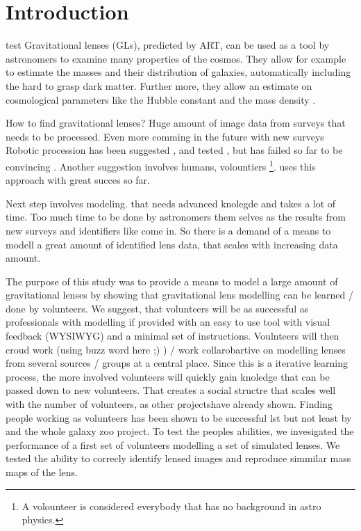 \section{Introduction}


test
Gravitational lenses (GLs), predicted by ART, can be used as a tool by astronomers to examine many properties of the cosmos.
They allow for example to estimate the masses and their distribution of galaxies, automatically including the hard to grasp dark matter.
Further more, they allow an estimate on cosmological parameters like the Hubble constant \citep{Saha2006} and the mass density \needcite.


How to find gravitational lenses? Huge amount of image data from surveys that needs to be processed.
Even more comming in the future with new surveys \needcite
Robotic procession has been suggested \needcite, and tested \needcite, but has failed so far to be convincing \needcite.
Another suggestion involves humans, volountiers \footnote{A volounteer is considered everybody that has no background in astro physics.}.
\sw uses this approach with great succes so far.\needcite


Next step involves modeling. that needs advanced knolegde and takes a lot of time.
Too much time to be done by astronomers them selves as the results from new surveys and identifiers like \sw come in.
So there is a demand of a means to modell a great amount of identified lens data, that scales with increasing data amount.


The purpose of this study was to provide a means to model a large amount of gravitational lenses by showing that gravitational lens modelling can be learned / done by volunteers.
We suggest, that volunteers will be as successful as professionals with modelling if provided with an easy to use tool with visual feedback (WYSIWYG) and a minimal set of instructions.
Voulnteers will then croud work (using buzz word here ;) ) / work collarobartive on modelling lenses from several sources / groups at a central place.
Since this is a iterative learning process, the more involved volunteers will quickly gain knoledge that can be passed down to new volunteers.
That creates a social structre that scales well with the number of volunteers, as other projects\needcite have already shown.
Finding people working as volunteers has been shown to be successful lst but not least by \sw and the whole galaxy zoo project.
To test the peoples abilities, we invesigated the performance of a first set of volunteers modelling a set of simulated lenses.
We tested the ability to correcly identify lensed images and reproduce simmilar mass maps of the lens.
